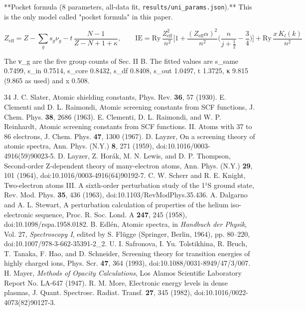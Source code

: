 \documentclass[aps,pra,preprint,superscriptaddress,amsmath,amssymb]{revtex4-2}
\begin{document}
**Pocket formula (8 parameters, all-data fit, \texttt{results/uni\_params.json}).** This is the only model called "pocket formula" in this paper.


\begin{equation}
Z_\mathrm{eff} = Z - \sum_g s_g\nu_g - t\,\frac{N-1}{Z-N+1+\kappa},\qquad
\mathrm{IE}=\mathrm{Ry}\,\frac{Z_\mathrm{eff}^2}{n^2}\Big[1+\frac{(Z_\mathrm{eff}\alpha)^2}{n^2}\Big(\frac{n}{j+\tfrac12}-\frac34\Big)\Big]+\mathrm{Ry}\,\frac{x\,K_l(k)}{n^2}
\end{equation}

The ν\_g are the five group counts of Sec. II B. The fitted values are s\_same 0.7499, s\_in 0.7514, s\_core 0.8432, s\_df 0.8408, s\_out 1.0497, t 1.3725, κ 9.815 (9.865 as used) and x 0.508.


\begin{thebibliography}{34}
 J. C. Slater, Atomic shielding constants, Phys. Rev. \textbf{36}, 57 (1930).
 E. Clementi and D. L. Raimondi, Atomic screening constants from SCF functions, J. Chem. Phys. \textbf{38}, 2686 (1963).
 E. Clementi, D. L. Raimondi, and W. P. Reinhardt, Atomic screening constants from SCF functions. II. Atoms with 37 to 86 electrons, J. Chem. Phys. \textbf{47}, 1300 (1967).
 D. Layzer, On a screening theory of atomic spectra, Ann. Phys. (N.Y.) \textbf{8}, 271 (1959), doi:10.1016/0003-4916(59)90023-5.
 D. Layzer, Z. Horák, M. N. Lewis, and D. P. Thompson, Second-order Z-dependent theory of many-electron atoms, Ann. Phys. (N.Y.) \textbf{29}, 101 (1964), doi:10.1016/0003-4916(64)90192-7.
 C. W. Scherr and R. E. Knight, Two-electron atoms III. A sixth-order perturbation study of the 1¹S ground state, Rev. Mod. Phys. \textbf{35}, 436 (1963), doi:10.1103/RevModPhys.35.436.
 A. Dalgarno and A. L. Stewart, A perturbation calculation of properties of the helium iso-electronic sequence, Proc. R. Soc. Lond. A \textbf{247}, 245 (1958), doi:10.1098/rspa.1958.0182.
 B. Edlén, Atomic spectra, in \emph{Handbuch der Physik}, Vol. 27, \emph{Spectroscopy I}, edited by S. Flügge (Springer, Berlin, 1964), pp. 80–220, doi:10.1007/978-3-662-35391-2\_2.
 U. I. Safronova, I. Yu. Tolstikhina, R. Bruch, T. Tanaka, F. Hao, and D. Schneider, Screening theory for transition energies of highly charged ions, Phys. Scr. \textbf{47}, 364 (1993), doi:10.1088/0031-8949/47/3/007.
 H. Mayer, \emph{Methods of Opacity Calculations}, Los Alamos Scientific Laboratory Report No. LA-647 (1947).
 R. M. More, Electronic energy levels in dense plasmas, J. Quant. Spectrosc. Radiat. Transf. \textbf{27}, 345 (1982), doi:10.1016/0022-4073(82)90127-3.

\end{thebibliography}
\end{document}
